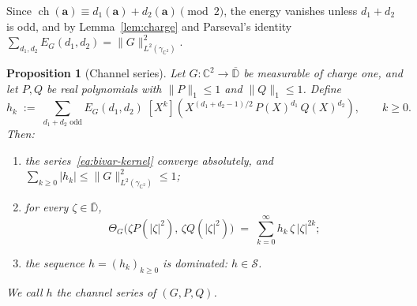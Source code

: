 \documentclass[11pt,reqno]{amsart}
\newtheorem{proposition}[theorem]{Proposition}
\theoremstyle{definition}
\numberwithin{equation}{section}
\newcommand{\C}{\mathbb{C}}
\newcommand{\D}{\mathbb{D}}
\newcommand{\gCC}{\gamma_{\C^2}}
\newcommand{\lone}[1]{\|#1\|_1}
\newcommand{\Scl}{\mathcal{S}}
\begin{document}
Since $\operatorname{ch}(\mathbf{a})\equiv d_1(\mathbf{a})+d_2(\mathbf{a})\pmod 2$, the energy vanishes unless $d_1+d_2$ is odd, and by Lemma~\ref{lem:charge} and Parseval's identity $\sum_{d_1,d_2}E_G(d_1,d_2)=\|G\|_{L^2(\gCC)}^2$.

\begin{proposition}[Channel series]\label{prop:channel}
Let $G:\C^2\to\overline{\D}$ be measurable of charge one, and let $P,Q$ be real polynomials with $\lone{P}\le1$ and $\lone{Q}\le1$. Define
\begin{equation}\label{eq:bivar-kernel}
  h_k \;:=\; \sum_{d_1 + d_2 \text{ odd}} E_G(d_1, d_2) \; [X^k]\!\left(X^{(d_1+d_2-1)/2}\, P(X)^{d_1}\, Q(X)^{d_2}\right),\qquad k\ge0 .
\end{equation}
Then:
\begin{enumerate}
  \item the series~\eqref{eq:bivar-kernel} converge absolutely, and $\sum_{k\ge0}|h_k|\le \|G\|_{L^2(\gCC)}^2\le1$;
  \item for every $\zeta\in\overline{\D}$,
  \[
    \Theta_G\bigl(\zeta P(|\zeta|^2),\,\zeta Q(|\zeta|^2)\bigr) \;=\; \sum_{k=0}^\infty h_k\,\zeta\,|\zeta|^{2k};
  \]
  \item the sequence $h=(h_k)_{k\ge0}$ is dominated: $h\in\Scl$.
\end{enumerate}
We call $h$ the \emph{channel series} of $(G,P,Q)$.
\end{proposition}
\end{document}
